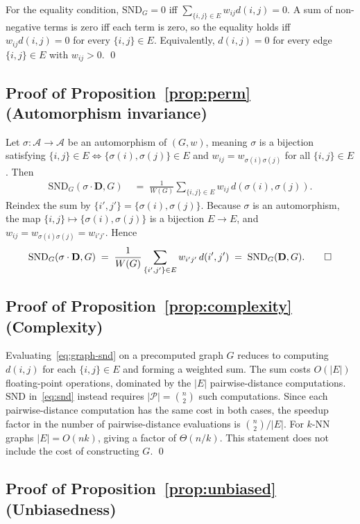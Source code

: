 \documentclass{article}
\theoremstyle{plain}
\theoremstyle{definition}
\theoremstyle{remark}
\newcommand{\Agents}{\mathcal{A}}        %
\newcommand{\Pairs}{\mathcal{P}}         %
\newcommand{\SND}{\ensuremath{\mathrm{SND}}}
\newcommand{\SNDG}{\mathrm{SND}_{G}}
\begin{document}
For the equality condition, $\SNDG = 0$ iff
$\sum_{\{i,j\} \in E} w_{ij} d(i,j) = 0$. A sum of non-negative terms is
zero iff each term is zero, so the equality holds iff $w_{ij} d(i,j) = 0$
for every $\{i,j\} \in E$. Equivalently, $d(i,j) = 0$ for every edge
$\{i,j\} \in E$ with $w_{ij} > 0$. \qed

\subsection*{Proof of Proposition~\ref{prop:perm} (Automorphism invariance)}

Let $\sigma : \Agents \to \Agents$ be an automorphism of $(G, w)$, meaning
$\sigma$ is a bijection satisfying $\{i,j\} \in E \iff \{\sigma(i),
\sigma(j)\} \in E$ and $w_{ij} = w_{\sigma(i)\sigma(j)}$ for all
$\{i,j\} \in E$. Then
\begin{align*}
\SNDG(\sigma \cdot \mathbf{D}, G)
&\;=\; \frac{1}{W(G)} \sum_{\{i,j\} \in E} w_{ij}\, d(\sigma(i), \sigma(j)).
\end{align*}
Reindex the sum by $\{i', j'\} = \{\sigma(i), \sigma(j)\}$. Because
$\sigma$ is an automorphism, the map $\{i,j\} \mapsto \{\sigma(i),
\sigma(j)\}$ is a bijection $E \to E$, and $w_{ij} =
w_{\sigma(i)\sigma(j)} = w_{i'j'}$. Hence
\[
\SNDG(\sigma \cdot \mathbf{D}, G)
\;=\; \frac{1}{W(G)} \sum_{\{i',j'\} \in E} w_{i'j'}\, d(i', j')
\;=\; \SNDG(\mathbf{D}, G). \qed
\]

\subsection*{Proof of Proposition~\ref{prop:complexity} (Complexity)}

Evaluating~\eqref{eq:graph-snd} on a precomputed graph $G$ reduces to
computing $d(i,j)$ for each $\{i,j\} \in E$ and forming a weighted sum. The
sum costs $O(|E|)$ floating-point operations, dominated by the $|E|$
pairwise-distance computations. $\SND$ in~\eqref{eq:snd} instead requires
$|\Pairs| = \binom{n}{2}$ such computations. Since each pairwise-distance
computation has the same cost in both cases, the speedup factor in the
number of pairwise-distance evaluations is $\binom{n}{2}/|E|$. For $k$-NN
graphs $|E| = O(nk)$, giving a factor of $\Theta(n/k)$. This statement
does not include the cost of constructing $G$. \qed

\subsection*{Proof of Proposition~\ref{prop:unbiased} (Unbiasedness)}
\end{document}
